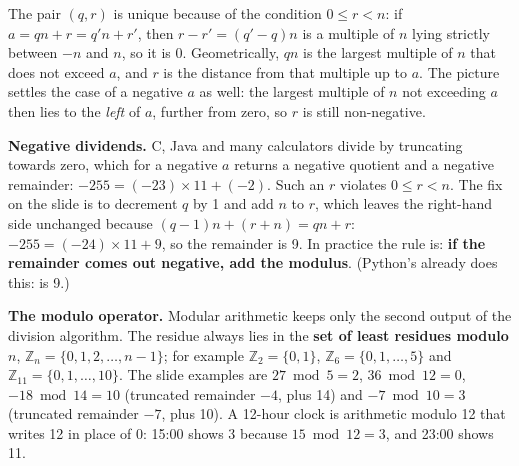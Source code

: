 The pair $(q, r)$ is unique because of the condition $0 \le r < n$: if $a = qn + r = q'n + r'$, then $r - r' = (q' - q)n$ is a multiple of $n$ lying strictly between $-n$ and $n$, so it is 0. Geometrically, $qn$ is the largest multiple of $n$ that does not exceed $a$, and $r$ is the distance from that multiple up to $a$. The picture settles the case of a negative $a$ as well: the largest multiple of $n$ not exceeding $a$ then lies to the \emph{left} of $a$, further from zero, so $r$ is still non-negative.
\begin{center}
\end{center}

\textbf{Negative dividends.} C, Java and many calculators divide by truncating towards zero, which for a negative $a$ returns a negative quotient and a negative remainder: $-255 = (-23) \times 11 + (-2)$. Such an $r$ violates $0 \le r < n$. The fix on the slide is to decrement $q$ by 1 and add $n$ to $r$, which leaves the right-hand side unchanged because $(q - 1)n + (r + n) = qn + r$: $-255 = (-24) \times 11 + 9$, so the remainder is 9. In practice the rule is: \textbf{if the remainder comes out negative, add the modulus}. (Python's \ttx{\%} already does this:  is 9.)

\textbf{The modulo operator.} Modular arithmetic keeps only the second output of the division algorithm.  The residue always lies in the \textbf{set of least residues modulo $n$}, $\mathbb{Z}_n = \{0, 1, 2, \dots, n-1\}$; for example $\mathbb{Z}_2 = \{0, 1\}$, $\mathbb{Z}_6 = \{0, 1, \dots, 5\}$ and $\mathbb{Z}_{11} = \{0, 1, \dots, 10\}$. The slide examples are $27 \bmod 5 = 2$, $36 \bmod 12 = 0$, $-18 \bmod 14 = 10$ (truncated remainder $-4$, plus 14) and $-7 \bmod 10 = 3$ (truncated remainder $-7$, plus 10). A 12-hour clock is arithmetic modulo 12 that writes 12 in place of 0: 15:00 shows 3 because $15 \bmod 12 = 3$, and 23:00 shows 11.

